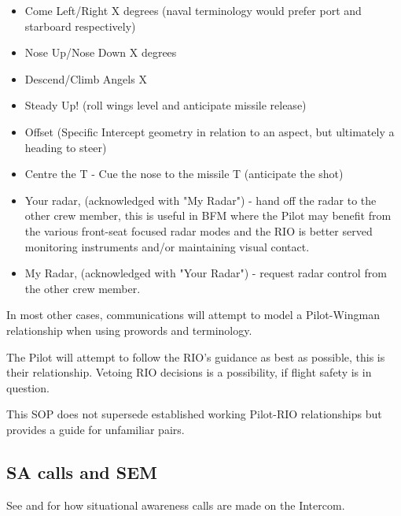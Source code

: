 \begin{itemize}
  \item Come Left/Right X degrees (naval terminology would prefer port and
  starboard respectively)

  \item Nose Up/Nose Down X degrees

  \item Descend/Climb Angels X

  \item Steady Up! (roll wings level and anticipate missile release)

  \item Offset (Specific Intercept geometry in relation to an aspect, but
  ultimately a heading to steer)

  \item Centre the T - Cue the nose to the missile T (anticipate the shot)

  \item Your radar, (acknowledged with "My Radar") - hand off the radar
  to the other crew member, this is useful in BFM where the Pilot may benefit
  from the various front-seat focused radar modes and the RIO is better served
  monitoring instruments and/or maintaining visual contact.

  \item My Radar, (acknowledged with "Your Radar") - request radar control from
  the other crew member.

\end{itemize}

In most other cases, communications will attempt to model a Pilot-Wingman
relationship when using prowords and terminology.

The Pilot will attempt to follow the RIO's guidance as best as possible, this
is their relationship. Vetoing RIO decisions is a possibility, if flight safety
is in question.

This SOP does not supersede established working Pilot-RIO relationships but
provides a guide for unfamiliar pairs.

\subsection{SA calls and SEM}

See  and  for how situational
awareness calls are made on the Intercom.

